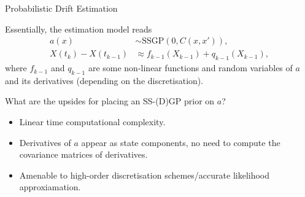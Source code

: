 \documentclass[seriffont, cmap=Beijing, 10pt]{zz}
\begin{document}
\begin{frame}{Probabilistic Drift Estimation}
	\begin{block}{}
		Essentially, the estimation model reads
		\begin{equation}
			\begin{split}
				a(x) &\sim \mathrm{SSGP}(0, C(x, x')),\\
				X(t_k) - X(t_{k-1}) &\approx f_{k-1}(X_{k-1}) + q_{k-1}(X_{k-1}),
			\end{split}
		\end{equation}
		where $f_{k-1}$ and $q_{k-1}$ are some \alert{non-linear functions and random variables} of $a$ and its \alert{derivatives} (depending on the discretisation).
	\end{block}
	\begin{block}{}
		What are the \alert{upsides} for placing an SS-(D)GP prior on $a$?
		\begin{itemize}
			\item \alert{Linear} time computational complexity.
			\item Derivatives of $a$ appear as \alert{state components}, no need to compute the covariance matrices of derivatives.
			\item Amenable to \alert{high-order discretisation schemes/accurate likelihood approxiamation}.
		\end{itemize}
	\end{block}
\end{frame}

\end{document}
